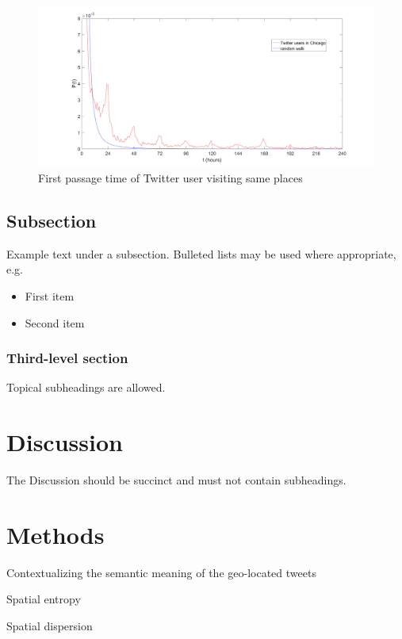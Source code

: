 \documentclass[fleqn,10pt]{wlscirep}
\begin{document}
\begin{figure}[ht]
\centering
\includegraphics[width=\linewidth]{firsttime}
\caption{First passage time of Twitter user visiting same places}
\label{fig:firsttime}
\end{figure}



\subsection*{Subsection}

Example text under a subsection. Bulleted lists may be used where appropriate, e.g.

\begin{itemize}
\item First item
\item Second item
\end{itemize}

\subsubsection*{Third-level section}
 
Topical subheadings are allowed.

\section*{Discussion}

The Discussion should be succinct and must not contain subheadings.

\section*{Methods}
Contextualizing the semantic meaning of the geo-located tweets

Spatial entropy

Spatial dispersion
\end{document}
